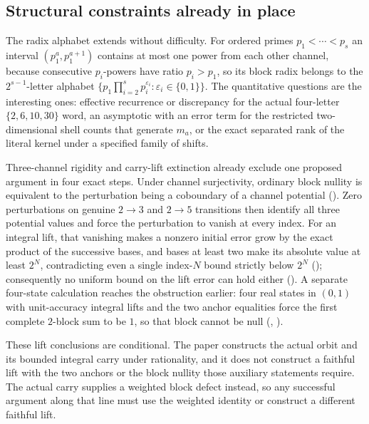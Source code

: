 \subsection{Structural constraints already in place}

The radix alphabet extends without difficulty.  For ordered primes
$p_1<\cdots<p_s$ an interval $(p_1^{a},p_1^{a+1})$ contains at most one power
from each other channel, because consecutive $p_i$-powers have ratio
$p_i>p_1$, so its block radix belongs to the $2^{s-1}$-letter alphabet
$\{p_1\prod_{i=2}^{s}p_i^{\varepsilon_i}:\varepsilon_i\in\{0,1\}\}$.  The
quantitative questions are the interesting ones: effective recurrence or
discrepancy for the actual four-letter $\{2,6,10,30\}$ word, an asymptotic with
an error term for the restricted two-dimensional shell counts that generate
$m_a$, or the exact separated rank of the literal kernel under a specified
family of shifts.

Three-channel rigidity and carry-lift extinction already exclude one proposed
argument in four exact steps.  Under channel surjectivity, ordinary block
nullity is equivalent to the perturbation being a coboundary of a channel
potential
().  Zero perturbations on genuine $2\to3$ and $2\to5$ transitions
then identify all three potential values and force the perturbation to vanish
at every index.  For an integral lift, that vanishing makes a nonzero initial
error grow by the exact product of the successive bases, and bases at least two
make its absolute value at least $2^{N}$, contradicting even a single
index-$N$ bound strictly below $2^{N}$
(); consequently no uniform bound on the lift error can hold either
().  A separate four-state calculation reaches the obstruction
earlier: four real states in $(0,1)$ with unit-accuracy integral lifts and the
two anchor equalities force the first complete $2$-block sum to be $1$, so that
block cannot be null
(,
).

These lift conclusions are conditional.  The paper constructs the actual orbit
and its bounded integral carry under rationality, and it does not construct a
faithful lift with the two anchors or the block nullity those auxiliary
statements require.  The actual carry supplies a weighted block defect instead,
so any successful argument along that line must use the weighted identity or
construct a different faithful lift.

